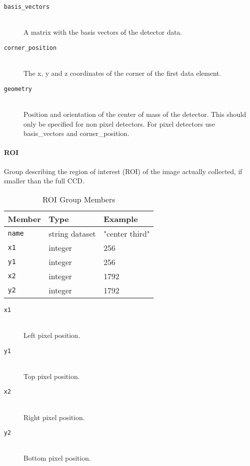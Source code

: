 \begin{description}
\item[\tt{basis\_vectors}] \hfill \\
{A matrix with the basis vectors of the detector data.}

\item[\tt{corner\_position}] \hfill \\
{The x, y and z coordinates of the corner of the first data element. }

\item[\tt{geometry}] \hfill \\
{Position and orientation of the center of mass of the detector. This should only be specified for non pixel detectors. For pixel detectors use basis\_vectors and corner\_position.}

\end{description}

\paragraph{ROI}
\label{table:roi}

Group describing the region of interest (ROI) of the image actually collected, if smaller than the full CCD.

\begin{table}[h!]\sffamily \footnotesize
\caption{ROI Group Members}
\centering
{}
\begin{tabular}{l l l}
\toprule
\bfseries Member     & \bfseries Type & \bfseries Example \\
\midrule
\tt{name} & string dataset & "center third" \\ 
\tt{x1} & integer & 256  \\   
\tt{y1} & integer &  256  \\
\tt{x2} & integer & 1792  \\
\tt{y2} & integer & 1792  \\
\bottomrule
\end{tabular}
\end{table}

\begin{description}
\item[\tt{x1}] \hfill \\
{Left pixel position.}

\item[\tt{y1}] \hfill \\
{Top pixel position.}

\item[\tt{x2}] \hfill \\
{Right pixel position.}

\item[\tt{y2}] \hfill \\
{Bottom pixel position.}
\end{description}

